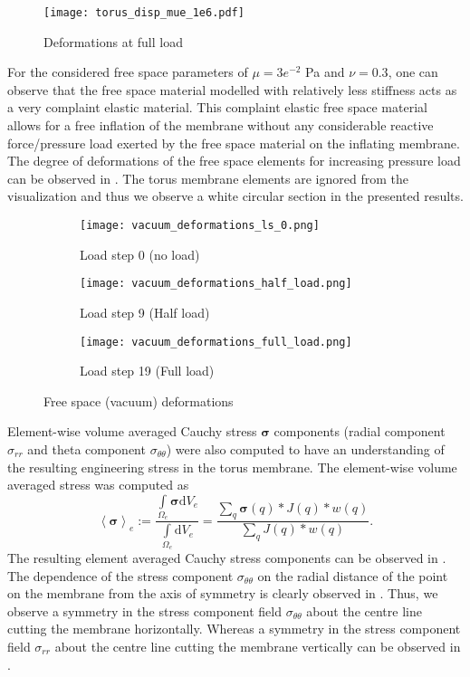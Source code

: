 \begin{figure}[h!]
\centering
\texttt{[image: torus\_disp\_mue\_1e6.pdf]}
\caption{Deformations at full load}
\label{fig:2.9}
\end{figure}

For the considered free space parameters of $\mu = 3e^{-2}$ Pa and $\nu = 0.3$, one can observe that the free space material modelled with relatively less stiffness acts as a very complaint elastic material. This complaint elastic free space material allows for a free inflation of the membrane without any considerable reactive force/pressure load exerted by the free space material on the inflating membrane. The degree of deformations of the free space elements for increasing pressure load can be observed in . The torus membrane elements are ignored from the visualization and thus we observe a white circular section in the presented results.\par 

\begin{figure}[h!]
\centering 
\begin{subfigure}[b]{0.32\textwidth}
\centering
\texttt{[image: vacuum\_deformations\_ls\_0.png]}
\caption{Load step 0 (no load)}
\label{fig:2.10.1}
\end{subfigure}
\begin{subfigure}[b]{0.32\textwidth}
\centering
\texttt{[image: vacuum\_deformations\_half\_load.png]}
\caption{Load step 9 (Half load)}
\label{fig:2.10.2}
\end{subfigure}
\begin{subfigure}[b]{0.32\textwidth}
\centering
\texttt{[image: vacuum\_deformations\_full\_load.png]}
\caption{Load step 19 (Full load)}
\label{fig:2.10.3}
\end{subfigure}
\caption{Free space (vacuum) deformations}
\label{fig:2.10}
\end{figure}

Element-wise volume averaged Cauchy stress $\bm{\sigma}$ components (radial component $\sigma_{rr}$ and theta component $\sigma_{\theta \theta}$) were also computed to have an understanding of the resulting engineering stress in the torus membrane. The element-wise volume averaged stress was computed as
\begin{equation}
\left\langle \bm{\sigma} \right\rangle_e := \dfrac{\int\limits_{\Omega_{e}} \bm{\sigma} \mathrm{d}V_e}{\int\limits_{\Omega_{e}} \mathrm{d}V_e} = \dfrac{\sum\limits_{q} \bm{\sigma}(q) * J(q) * w(q)}{\sum\limits_{q} J(q) * w(q)}.
\end{equation}  
The resulting element averaged Cauchy stress components can be observed in . The dependence of the stress component $\sigma_{\theta \theta}$ on the radial distance of the point on the membrane from the axis of symmetry is clearly observed in . Thus, we observe a symmetry in the stress component field $\sigma_{\theta \theta}$ about the centre line cutting the membrane horizontally. Whereas a symmetry in the stress component field $\sigma_{rr}$ about the centre line cutting the membrane vertically can be observed in . \par 
 
